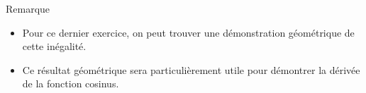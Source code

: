 \documentclass[12pt,a4paper,french]{article}
\theoremstyle{break}
\theoremstyle{plain}
\theoremstyle{nonumberplain}
\theoremstyle{nonumberbreak}
\begin{document}
\begin{bclogo}[noborder,logo=\bcinfo]{Remarque}%
  \begin{itemize}
    \item Pour ce dernier exercice, on peut trouver une démonstration
      géométrique de cette inégalité.
    \item Ce résultat géométrique sera particulièrement utile pour
      démontrer la dérivée de la fonction cosinus.
  \end{itemize}
\end{bclogo}
\end{document}
